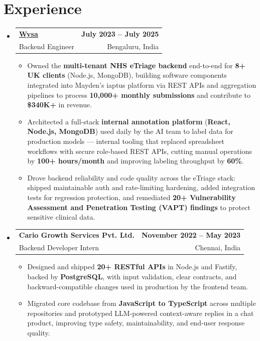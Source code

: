 \documentclass[letterpaper,10pt]{article}
\makeatletter
\newcommand{\resumeItem}[1]{
  \item\small{#1\vspace{-1pt}}
}
\newcommand{\resumeSubheading}[4]{
  \vspace{1pt}\item
    \begin{tabular*}{0.985\textwidth}[t]{l@{\extracolsep{\fill}}r}
      \textbf{#1} & \textbf{\small #2} \\
      {\small\color{ResumeSlate} #3} & {\small\color{ResumeSlate} #4} \\
    \end{tabular*}\vspace{-6pt}
}
\newcommand{\resumeSubHeadingListStart}{\begin{itemize}[leftmargin=0.0in, label={}, itemsep=2pt, topsep=2pt]}
\newcommand{\resumeSubHeadingListEnd}{\end{itemize}}
\newcommand{\resumeItemListStart}{\begin{itemize}[leftmargin=0.18in, itemsep=2pt, topsep=1pt]}
\newcommand{\resumeItemListEnd}{\end{itemize}\vspace{-4pt}}
\makeatother
\begin{document}
\section{Experience}
\resumeSubHeadingListStart
  \resumeSubheading
    {\href{https://www.wysa.io}{Wysa}}{July 2023 -- July 2025}
    {Backend Engineer}{Bengaluru, India}
    \resumeItemListStart
      \resumeItem{Owned the \textbf{multi-tenant NHS eTriage backend} end-to-end for \textbf{8+ UK clients} (Node.js, MongoDB), building software components integrated into Mayden's iaptus platform via REST APIs and aggregation pipelines to process \textbf{10{,}000+ monthly submissions} and contribute to \textbf{\$340K+} in revenue.}
      \resumeItem{Architected a full-stack \textbf{internal annotation platform} (\textbf{React, Node.js, MongoDB}) used daily by the AI team to label data for production models --- internal tooling that replaced spreadsheet workflows with secure role-based REST APIs, cutting manual operations by \textbf{100+ hours/month} and improving labeling throughput by \textbf{60\%}.}
      \resumeItem{Drove backend reliability and code quality across the eTriage stack: shipped maintainable auth and rate-limiting hardening, added integration tests for regression protection, and remediated \textbf{20+ Vulnerability Assessment and Penetration Testing (VAPT) findings} to protect sensitive clinical data.}
    \resumeItemListEnd
  \resumeSubheading
    {Cario Growth Services Pvt. Ltd.}{November 2022 -- May 2023}
    {Backend Developer Intern}{Chennai, India}
    \resumeItemListStart
      \resumeItem{Designed and shipped \textbf{20+ RESTful APIs} in Node.js and Fastify, backed by \textbf{PostgreSQL}, with input validation, clear contracts, and backward-compatible changes used in production by the frontend team.}
      \resumeItem{Migrated core codebase from \textbf{JavaScript to TypeScript} across multiple repositories and prototyped LLM-powered context-aware replies in a chat product, improving type safety, maintainability, and end-user response quality.}
    \resumeItemListEnd
\resumeSubHeadingListEnd
\vspace{-4pt}
\end{document}
